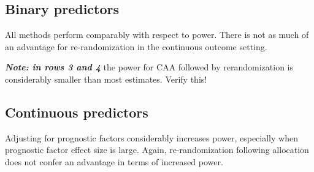 \subsection{Binary predictors}
All methods perform comparably with respect to power. 
There is not as much of an advantage for re-randomization in the continuous outcome setting.

\textbf{\textit{Note: in rows 3 and 4}} the power for CAA followed by rerandomization is considerably smaller than most estimates. Verify this!

\subsection{Continuous predictors}
Adjusting for prognostic factors considerably increases power, especially when prognostic factor effect size is large.
Again, re-randomization following allocation does not confer an advantage in terms of increased power.